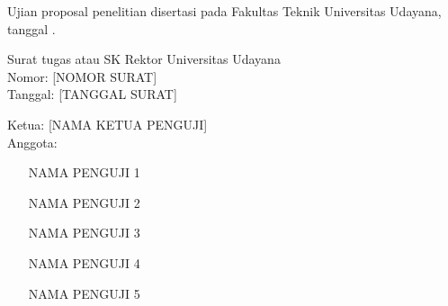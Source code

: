 \newpage
{}
\begin{center}
\begin{onehalfspace}
Ujian proposal penelitian disertasi pada Fakultas Teknik Universitas Udayana, tanggal \tglujiandanpenilaian.
\end{onehalfspace}
\end{center}
\begin{center}
Surat tugas atau SK Rektor Universitas Udayana\\
Nomor: [NOMOR SURAT]\\
Tanggal: [TANGGAL SURAT]
\end{center}
\begin{onehalfspace}
\raggedright
Ketua: [NAMA KETUA PENGUJI]\\
Anggota:
\begin{enumerate}
\item [NAMA PENGUJI 1]
\item [NAMA PENGUJI 2]
\item [NAMA PENGUJI 3]
\item [NAMA PENGUJI 4]
\item [NAMA PENGUJI 5]
\end{enumerate}
\end{onehalfspace}
